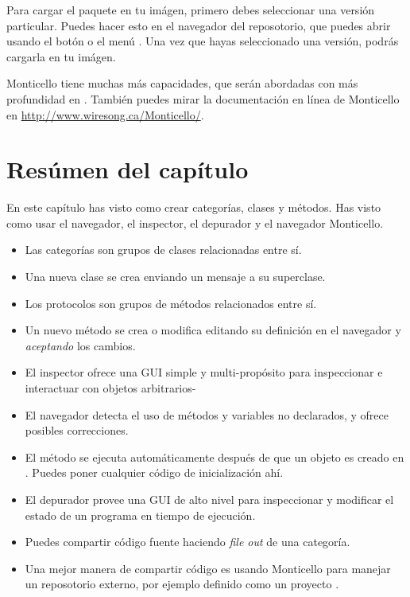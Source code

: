 \documentclass[a4paper,10pt,twoside]{book}
\begin{document}

Para cargar el paquete en tu im\'agen, primero debes seleccionar una versi\'on particular. Puedes hacer esto en el navegador del reposotorio, que puedes abrir usando el bot\'on  o el men\'u \actclick. Una vez que hayas seleccionado una versi\'on, podr\'as cargarla en tu im\'agen.


Monticello tiene muchas m\'as capacidades, que ser\'an abordadas con m\'as profundidad en .
Tambi\'en puedes mirar la documentaci\'on en l\'inea de Monticello en \url{http://www.wiresong.ca/Monticello/}.

\section{Res\'umen del cap\'itulo}
En este cap\'itulo has visto como crear categor\'ias, clases y m\'etodos. Has visto como usar el navegador, el inspector, el depurador y el navegador Monticello.

\begin{itemize}
  \item Las categor\'ias son grupos de clases relacionadas entre s\'i.
  \item Una nueva clase se crea enviando un mensaje a su superclase.
  \item Los protocolos son grupos de m\'etodos relacionados entre s\'i.
  \item Un nuevo m\'etodo se crea o modifica editando su definici\'on en el navegador y \emph{aceptando} los cambios.
  \item El inspector ofrece una GUI simple y multi-prop\'osito para inspeccionar e interactuar con objetos arbitrarios-
  \item El navegador detecta el uso de m\'etodos y variables no declarados, y ofrece posibles correcciones.
  \item El m\'etodo  se ejecuta autom\'aticamente despu\'es de que un objeto es creado en \pharo. Puedes poner cualquier c\'odigo de inicializaci\'on ah\'i.
  \item El depurador provee una GUI de alto nivel para inspeccionar y modificar el estado de un programa en tiempo de ejecuci\'on.
  \item Puedes compartir c\'odigo fuente haciendo \emph{file out} de una categor\'ia.
  \item Una mejor manera de compartir c\'odigo es usando Monticello para manejar un reposotorio externo, por ejemplo definido como un proyecto \sqsrc.
\end{itemize}

\ifx\wholebook\relax\else
\end{document}
